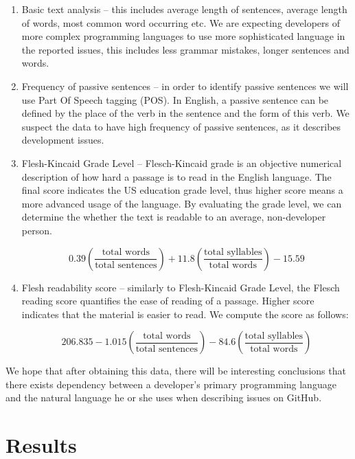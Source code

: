 \documentclass[]{article}
\begin{document}
\begin{enumerate}
    \item Basic text analysis -- this includes average length of sentences, average length of words, most common word occurring etc. We are expecting developers of more complex programming languages to use more sophisticated language in the reported issues, this includes less grammar mistakes, longer sentences and words.

    \item Frequency of passive sentences -- in order to identify passive sentences we will use Part Of Speech tagging (POS). In English, a passive sentence can be defined by the place of the verb in the sentence and the form of this verb. We suspect the data to have high frequency of passive sentences, as it describes development issues.

    \item Flesh-Kincaid Grade Level -- Flesch-Kincaid grade is an objective numerical description of how hard a passage is to read in the English language. The final score indicates the US education grade level, thus higher score means a more advanced usage of the language. By evaluating the grade level, we can determine the whether the text is readable to an average, non-developer person.

          \[0.39\left(\frac{\text{total words}}{\text{total sentences}}\right) + 11.8\left(\frac{\text{total syllables}}{\text{total words}}\right) - 15.59\]

    \item Flesh readability score -- similarly to Flesh-Kincaid Grade Level, the Flesch reading score quantifies the ease of reading of a passage. Higher score indicates that the material is easier to read. We compute the score as follows:

          \[206.835 - 1.015\left(\frac{\text{total words}}{\text{total sentences}}\right) - 84.6\left(\frac{\text{total syllables}}{\text{total words}}\right)\]
\end{enumerate}

We hope that after obtaining this data, there will be interesting conclusions that there exists dependency between a developer's primary programming language and the natural language he or she uses when describing issues on GitHub.

\section{Results}
\end{document}
